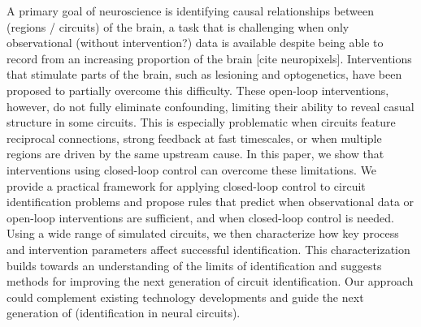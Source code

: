 A primary goal of neuroscience is identifying causal relationships between (regions / circuits) of the brain,
a task that is challenging when only observational (without intervention?) data is available despite being able to record from an increasing proportion of the brain [cite neuropixels].
Interventions that stimulate parts of the brain, such as lesioning and optogenetics, have been proposed to partially overcome this difficulty.
These open-loop interventions, however, do not fully eliminate confounding, limiting their ability to reveal casual structure in some circuits. This is especially problematic when circuits feature reciprocal connections, strong feedback at fast timescales, or when multiple regions are driven by the same upstream cause.
In this paper, we show that interventions using closed-loop control can overcome these limitations.
We provide a practical framework for applying closed-loop control to circuit identification problems and propose rules that predict when observational data or open-loop interventions are sufficient, and when closed-loop control is needed. Using a wide range of simulated circuits, we then characterize how key process and intervention parameters affect successful identification. This characterization builds towards an understanding of the limits of identification  and suggests methods for improving the next generation of circuit identification.
Our approach could complement existing technology developments and guide the next generation of (identification in neural circuits).


